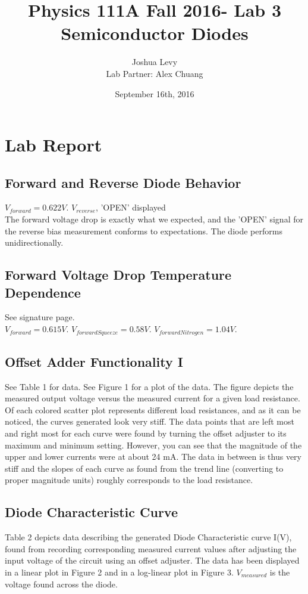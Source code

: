 \documentclass{article}
\title{Physics 111A Fall 2016- Lab 3\\
Semiconductor Diodes}
\author{Joshua Levy\\Lab Partner: Alex Chuang}
\date{September 16th, 2016}
\begin{document}
\maketitle

\section{Lab Report}
\subsection{Forward and Reverse Diode Behavior}
    $V_{forward} = 0.622 V$.
    $V_{reverse}$, 'OPEN' displayed\\ The forward voltage drop is exactly what we expected, and the 
    'OPEN' signal for the reverse bias measurement conforms to expectations. The diode performs unidirectionally.
\subsection{Forward Voltage Drop Temperature Dependence}
    See signature page.\\
    $V_{forward} = 0.615 V$.
    $V_{forwardSqueeze} = 0.58 V$.
    $V_{forwardNitrogen} = 1.04 V$.
\subsection{Offset Adder Functionality I}
    See Table 1 for data. See Figure 1 for a plot of the data. The figure depicts the measured output voltage versus the measured current for a given load resistance. Of each colored scatter plot represents different load resistances, and as it can be noticed, the curves generated look very stiff. The data points that are left most and right most for each curve were found by turning the offset adjuster to its maximum and minimum setting. However, you can see that the magnitude of the upper and lower currents were at about 24 mA. The data in between is thus very stiff and the slopes of each curve as found from the trend line (converting to proper magnitude units) roughly corresponds to the load resistance.
\subsection{Diode Characteristic Curve}
    Table 2 depicts data describing the generated Diode Characteristic curve I(V), found from recording corresponding measured current values after adjusting the input voltage of the circuit using an offset adjuster. The data has been displayed in a linear plot in Figure 2 and in a log-linear plot in Figure 3. $V_{measured}$ is the voltage found across the diode.
\end{document}
